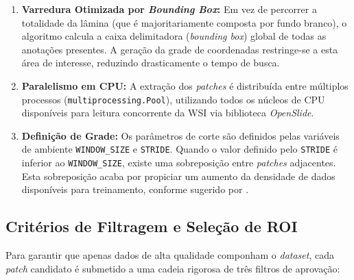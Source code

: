 \begin{enumerate}
    \item \textbf{Varredura Otimizada por \textit{Bounding Box}:} Em vez de percorrer a totalidade da lâmina (que é majoritariamente composta por fundo branco), o algoritmo calcula a caixa delimitadora (\textit{bounding box}) global de todas as anotações presentes. A geração da grade de coordenadas restringe-se a esta área de interesse, reduzindo drasticamente o tempo de busca.
    
    \item \textbf{Paralelismo em CPU:} A extração dos \textit{patches} é distribuída entre múltiplos processos (\texttt{multiprocessing.Pool}), utilizando todos os núcleos de CPU disponíveis para leitura concorrente da WSI via biblioteca \textit{OpenSlide}.
    
    \item \textbf{Definição de Grade:} Os parâmetros de corte são definidos pelas variáveis de ambiente \texttt{WINDOW\_SIZE} e \texttt{STRIDE}. Quando o valor definido pelo \texttt{STRIDE} é inferior ao \texttt{WINDOW\_SIZE}, existe uma sobreposição entre \textit{patches} adjacentes. Esta sobreposição acaba por propiciar um aumento da densidade de dados disponíveis para treinamento, conforme sugerido por \textcite{Fan2020}.
\end{enumerate}

\subsection{Critérios de Filtragem e Seleção de ROI}

Para garantir que apenas dados de alta qualidade componham o \textit{dataset}, cada \textit{patch} candidato é submetido a uma cadeia rigorosa de três filtros de aprovação:


